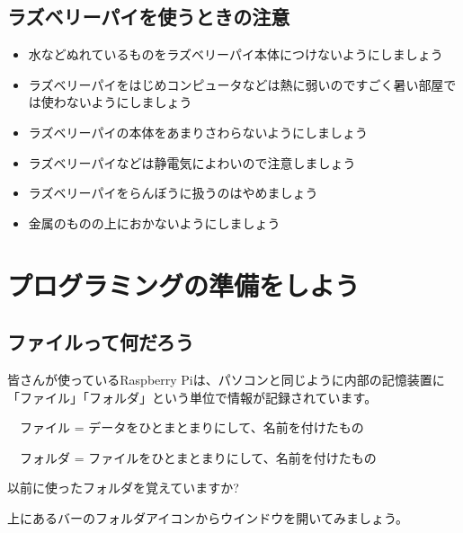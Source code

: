 \documentclass[a4paper,12pt]{jarticle}
\begin{document}
\subsection{ラズベリーパイを使うときの注意}
\begin{itemize}
\item
水などぬれているものをラズベリーパイ本体につけないようにしましょう
\end{itemize}
\begin{itemize}
\item
ラズベリーパイをはじめコンピュータなどは熱に弱いのですごく暑い部屋では使わないようにしましょう
\end{itemize}
\begin{itemize}
\item
ラズベリーパイの本体をあまりさわらないようにしましょう
\item
ラズベリーパイなどは静電気によわいので注意しましょう
\end{itemize}
\begin{itemize}
\item
ラズベリーパイをらんぼうに扱うのはやめましょう
\end{itemize}
\begin{itemize}
\item
金属のものの上におかないようにしましょう
\end{itemize}




\clearpage
\section{プログラミングの準備をしよう}
\subsection{ファイルって何だろう}
\bigskip
\bigskip

皆さんが使っているRaspberry Piは、パソコンと同じように内部の記憶装置に「ファイル」「フォルダ」という単位で情報が記録されています。


\bigskip

\ \ ファイル =
データをひとまとまりにして、名前を付けたもの

\ \ フォルダ =
ファイルをひとまとまりにして、名前を付けたもの


\bigskip

以前に使ったフォルダを覚えていますか?

上にあるバーのフォルダアイコンからウインドウを開いてみましょう。
\end{document}
